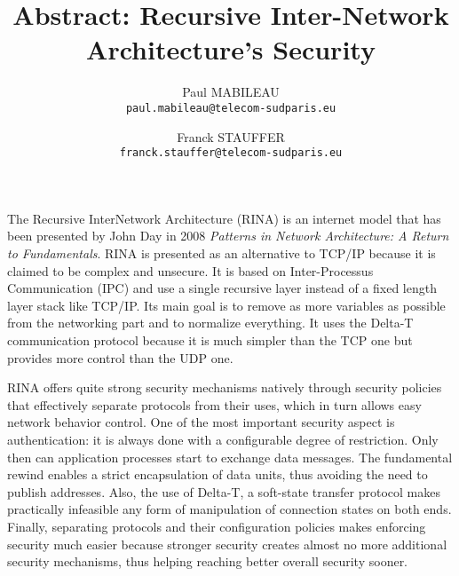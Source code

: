 \documentclass[a4paper]{article}
\author{Paul MABILEAU\\\texttt{paul.mabileau@telecom-sudparis.eu}
        \and Franck STAUFFER\\\texttt{franck.stauffer@telecom-sudparis.eu}}
\title{\textbf{Abstract: Recursive Inter-Network Architecture's Security}}
\begin{document}
\maketitle

The Recursive InterNetwork Architecture (RINA) is an internet model that has
been presented by John Day in 2008 \textit{Patterns in Network Architecture: A
Return to Fundamentals}.  RINA is presented as an alternative to TCP/IP because
it is claimed to be complex and unsecure.  It is based on Inter-Processus
Communication (IPC) and use a single recursive layer instead of a fixed length
layer stack like TCP/IP\@.  Its main goal is to remove as more variables as
possible from the networking part and to normalize everything.  It uses the
Delta-T communication protocol because it is much simpler than the TCP one but
provides more control than the UDP one.

RINA offers quite strong security mechanisms natively through security policies
that effectively separate protocols from their uses, which in turn allows easy
network behavior control. One of the most important security aspect is
authentication: it is always done with a configurable degree of restriction.
Only then can application processes start to exchange data messages. The
fundamental rewind enables a strict encapsulation of data units, thus avoiding
the need to publish addresses. Also, the use of Delta-T, a soft-state transfer
protocol makes practically infeasible any form of manipulation of connection
states on both ends. Finally, separating protocols and their configuration
policies makes enforcing security much easier because stronger security creates
almost no more additional security mechanisms, thus helping reaching better
overall security sooner.
\end{document}
